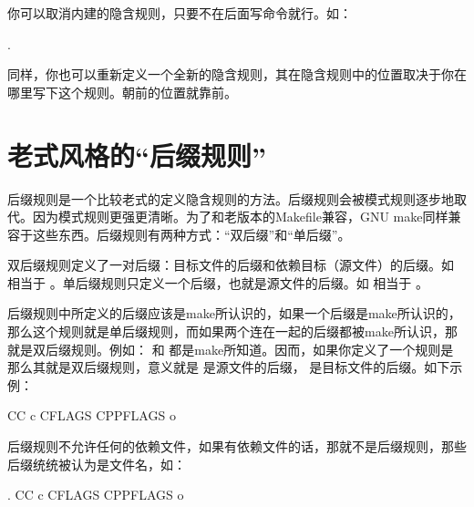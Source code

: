 \documentclass[a4paper,10pt]{sphinxmanual}
\begin{document}
你可以取消内建的隐含规则，只要不在后面写命令就行。如：

\begin{sphinxVerbatim}[commandchars=\\\{\}]
 \PYGZpc{}.
\end{sphinxVerbatim}

同样，你也可以重新定义一个全新的隐含规则，其在隐含规则中的位置取决于你在哪里写下这个规则。朝前的位置就靠前。


\section{老式风格的“后缀规则”}
\label{\detokenize{implicit_rules:id14}}
后缀规则是一个比较老式的定义隐含规则的方法。后缀规则会被模式规则逐步地取代。因为模式规则更强更清晰。为了和老版本的Makefile兼容，GNU make同样兼容于这些东西。后缀规则有两种方式：“双后缀”和“单后缀”。

双后缀规则定义了一对后缀：目标文件的后缀和依赖目标（源文件）的后缀。如  相当于  。单后缀规则只定义一个后缀，也就是源文件的后缀。如  相当于  。

后缀规则中所定义的后缀应该是make所认识的，如果一个后缀是make所认识的，那么这个规则就是单后缀规则，而如果两个连在一起的后缀都被make所认识，那就是双后缀规则。例如：  和  都是make所知道。因而，如果你定义了一个规则是  那么其就是双后缀规则，意义就是  是源文件的后缀， 
是目标文件的后缀。如下示例：

\begin{sphinxVerbatim}[commandchars=\\\{\}]
    CC \PYGZhy{}c CFLAGS CPPFLAGS \PYGZhy{}o  \PYGZdl{}\PYGZlt{}
\end{sphinxVerbatim}

后缀规则不允许任何的依赖文件，如果有依赖文件的话，那就不是后缀规则，那些后缀统统被认为是文件名，如：

\begin{sphinxVerbatim}[commandchars=\\\{\}]
 .
    CC \PYGZhy{}c CFLAGS CPPFLAGS \PYGZhy{}o  \PYGZdl{}\PYGZlt{}
\end{sphinxVerbatim}
\end{document}
